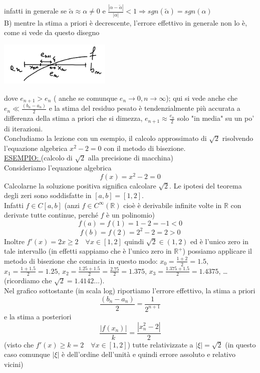 \documentclass[12pt]{article}
\begin{document}
infatti in generale se $\tilde{\alpha} \approx \alpha \neq 0$ e $\frac{|\alpha-\tilde{\alpha}|}{|\alpha|}<1 \Rightarrow sgn(\tilde{\alpha})=sgn(\alpha)$\\
B) mentre la stima a priori è decrescente, l'errore effettivo in generale non lo è, come si vede da questo disegno
\begin{center}
    \includegraphics[width=0.4\textwidth]{grafo3.png}\par
\end{center}
 dove $e_{n+1}>e_n$ ( anche se comunque $e_n \rightarrow 0, n \rightarrow \infty$); qui si vede anche che $e_n\ll\frac{(b_n-a_n)}{2}$ e la stima del residuo pesato è tendenzialmente più accurata a differenza della stima a priori che si dimezza, $e_{n+1}\approx\frac{e_n}{2}$ solo "in media" su un po' di iterazioni.\\
Concludiamo la lezione con un esempio, il calcolo approssimato di $\sqrt{2}$ risolvendo l'equazione algebrica $x^2 -2 = 0$ con il metodo di bisezione.\\
\underline{ESEMPIO: }(calcolo di $\sqrt{2}$ alla precisione di macchina)\\ Consideriamo l'equazione algebrica
\[f(x)=x^2-2=0\] Calcolarne la soluzione positiva significa calcolare $\sqrt{2}$. Le ipotesi del teorema degli zeri sono soddisfatte in $[a,b]=[1,2]$.\\
Infatti $f\in C[a,b]$ (anzi $f\in C^{\infty}(\mathbb{R})$ cioè è derivabile infinite volte in $\mathbb{R}$ con derivate tutte continue, perché $f$ è un polinomio) \[f(a)=f(1)=1-2=-1<0\] \[f(b)=f(2)=2^2-2=2>0\]
Inoltre $f'(x)=2x \geq 2\quad\forall x \in [1,2]$ quindi $\sqrt{2}\in (1,2)$ ed è l'unico zero in tale intervallo (in effetti sappiamo che è l'unico zero in $\mathbb{R}^+$)
possiamo applicare il metodo di bisezione che comincia in questo modo: $x_0=\frac{1+2}{2}=1.5$, $x_1=\frac{1+1.5}{2}=1.25$, $x_2=\frac{1.25+1.5}{2}=\frac{2.75}{2}=1.375$,  $x_3=\frac{1.375+1.5}{2}=1.4375$, \dots (ricordiamo che $\sqrt{2}=1.4142\dots$).\\
Nel grafico sottostante (in scala log) riportiamo l'errore effettivo, la stima a priori \[\frac{(b_n-a_n)}{2}=\frac{1}{2^{n+1}}\] 
e la stima a posteriori \[\frac{|f(x_n)|}{k}=\frac{|x_n^2-2|}{2}\]
(visto che $f'(x)\ge k=2 \quad \forall x\in [1,2]$) tutte relativizzate a $|\xi|=\sqrt{2}$ (in questo caso comunque $|\xi|$ è dell'ordine dell'unità e quindi errore assoluto e relativo vicini) \\
\end{document}
